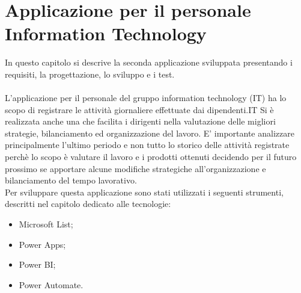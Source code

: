 \chapter{Applicazione per il personale Information Technology}\label{sec:2App}
In questo capitolo si descrive la seconda applicazione sviluppata presentando i requisiti, la progettazione, lo sviluppo e i test.\\
\\L'applicazione per il personale del gruppo information technology (IT) ha lo scopo di registrare le attività giornaliere effettuate dai dipendenti.IT
Si è realizzata anche una  che facilita i dirigenti nella valutazione delle migliori strategie, bilanciamento ed organizzazione del lavoro. 
E' importante analizzare principalmente l’ultimo periodo e non tutto lo storico delle attività registrate perchè lo scopo è valutare il lavoro e i prodotti ottenuti decidendo per il futuro prossimo se apportare alcune modifiche strategiche all'organizzazione e bilanciamento del tempo lavorativo.\\
Per sviluppare questa applicazione sono stati utilizzati i seguenti strumenti, descritti nel capitolo dedicato alle tecnologie:
\begin{itemize}
    \item Microsoft List;
    \item Power Apps;
    \item Power BI;
    \item Power Automate.
\end{itemize}
\newpage%

